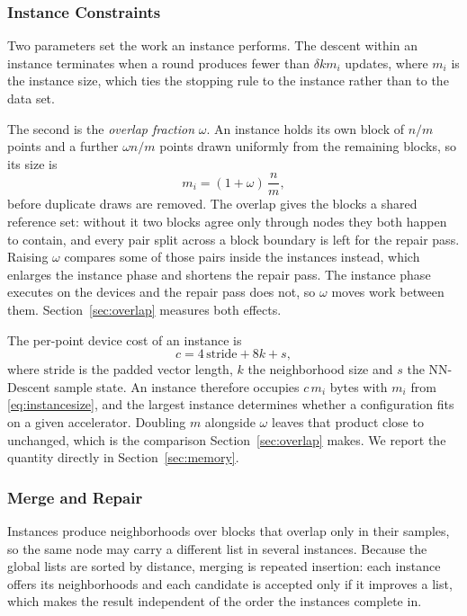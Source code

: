 \documentclass{ieeeaccess}
\begin{document}
\subsubsection{Instance Constraints}

Two parameters set the work an instance performs. The descent within an
instance terminates when a round produces fewer than $\delta k m_i$ updates,
where $m_i$ is the instance size, which ties the stopping rule to the instance
rather than to the data set.

The second is the \emph{overlap fraction} $\omega$. An instance holds its own
block of $n/m$ points and a further $\omega n/m$ points drawn uniformly from
the remaining blocks, so its size is
\begin{equation}
\label{eq:instancesize}
m_i = (1 + \omega)\,\frac{n}{m},
\end{equation}
before duplicate draws are removed. The overlap gives the blocks a shared
reference set: without it two blocks agree only through nodes they both happen
to contain, and every pair split across a block boundary is left for the repair
pass. Raising $\omega$ compares some of those pairs inside the instances
instead, which enlarges the instance phase and shortens the repair pass. The
instance phase executes on the devices and the repair pass does not, so $\omega$
moves work between them. Section~\ref{sec:overlap} measures both effects.

The per-point device cost of an instance is
\begin{equation}
\label{eq:devicecost}
c = 4\,\mathrm{stride} + 8k + s,
\end{equation}
where $\mathrm{stride}$ is the padded vector length, $k$ the neighborhood size
and $s$ the NN-Descent sample state. An instance therefore occupies $c\,m_i$
bytes with $m_i$ from \eqref{eq:instancesize}, and the largest instance
determines whether a configuration fits on a given accelerator. Doubling $m$
alongside $\omega$ leaves that product close to unchanged, which is the
comparison Section~\ref{sec:overlap} makes. We report the quantity directly in
Section~\ref{sec:memory}.

\subsubsection{Merge and Repair}
\label{sec:repair}

Instances produce neighborhoods over blocks that overlap only in their samples,
so the same node may carry a different list in several instances. Because the
global lists are sorted by distance, merging is repeated insertion: each instance
offers its neighborhoods and each candidate is accepted only if it improves a
list, which makes the result independent of the order the instances complete in.
\end{document}
